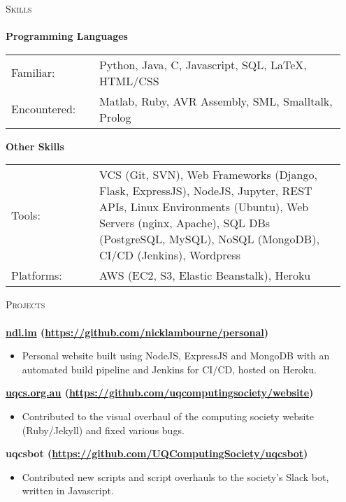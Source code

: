 \documentclass[a4paper]{article}
\newcommand{\lineunder} {
    \vspace*{-8pt} \\
    \hspace*{-18pt} \hrulefill \\
}
\newcommand{\header} [1] {
    {\hspace*{-18pt}\vspace*{6pt} \textsc{#1}}
    \vspace*{-6pt} \lineunder
}
\newenvironment{singleitem}
{   \small
    \vspace{-2.6pt}
    \begin{itemize}
    \setlength{\itemsep}{0pt}
    \setlength{\parskip}{0pt}
    \setlength{\parsep}{0pt}   }
{\end{itemize} \vspace{-2.6pt}	}
\begin{document}
\vspace{-1mm}
\header{Skills}
\textbf{Programming Languages}
\begin{tabular}{p{0.25\linewidth}p{0.7\linewidth}}
	\small Familiar: & \small Python, Java, C, Javascript, SQL, \LaTeX, HTML/CSS \\
	\small Encountered: & \small Matlab, Ruby, AVR Assembly, SML, Smalltalk, Prolog\\
\end{tabular}
\textbf{Other Skills}
\begin{tabular}{p{0.25\linewidth}p{0.7\linewidth}}
	\small Tools: & \small VCS (Git, SVN), Web Frameworks (Django, Flask, ExpressJS), NodeJS,  Jupyter, REST APIs, Linux Environments (Ubuntu), Web Servers (nginx, Apache), SQL DBs (PostgreSQL, MySQL), NoSQL (MongoDB), CI/CD (Jenkins), Wordpress \\
	\small Platforms: & \small AWS (EC2, S3, Elastic Beanstalk), Heroku  \\
\end{tabular}

\vspace{1mm}


\vspace{1mm}

\header{Projects}
\vspace{1mm}
\textbf{\href{https://ndl.im}{ndl.im} (\href{https://github.com/nicklambourne/personal}{https://github.com/nicklambourne/personal})}
\begin{singleitem}
	\item Personal website built using NodeJS, ExpressJS and MongoDB with an automated build pipeline and Jenkins for CI/CD, hosted on Heroku.
\end{singleitem}

\textbf{\href{https://uqcs.org.au}{uqcs.org.au} (\href{https://github.com/uqcomputingsociety/website}{https://github.com/uqcomputingsociety/website})}
\begin{singleitem}
	\item Contributed to the visual overhaul of the computing society website (Ruby/Jekyll) and fixed various bugs.
\end{singleitem}

\textbf{uqcsbot (\href{https://github.com/UQComputingSociety/uqcsbot}{https://github.com/UQComputingSociety/uqcsbot})}
\begin{singleitem}
	\item Contributed new scripts and script overhauls to the society's Slack bot, written in Javascript.
\end{singleitem}
\end{document}
